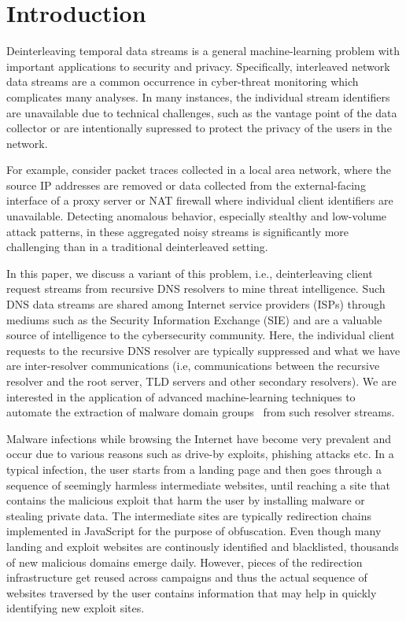 \documentclass[conference]{IEEEtran}
\begin{document}
	\section{Introduction}
	
	Deinterleaving temporal data streams is a general machine-learning
	problem with important applications to security and privacy.
	Specifically, interleaved network data streams are a common occurrence
	in cyber-threat monitoring which complicates many analyses.  In many
	instances, the individual stream identifiers are unavailable due
	to technical challenges, such as the vantage point of the data
	collector or are intentionally supressed to protect the privacy
	of the users in the network.
	
	For example, consider packet traces collected in a local area network,
	where the source IP addresses are removed or data collected from the
	external-facing interface of a proxy server or NAT firewall
	where individual client identifiers are unavailable.  Detecting anomalous
	behavior, especially stealthy and low-volume attack patterns, in
	these aggregated noisy streams is significantly more challenging than
	in a traditional deinterleaved setting.
	
	In this paper, we discuss a variant of this problem, i.e.,
	deinterleaving client request streams from recursive DNS resolvers
	to mine threat intelligence.  Such DNS data streams are shared
	among Internet service providers (ISPs) through mediums such
	as the Security Information Exchange (SIE) and are a valuable
	source of intelligence to the cybersecurity community.  Here, the individual
	client requests to the recursive DNS resolver are typically suppressed and
	what we have are inter-resolver communications (i.e, communications
	between the recursive resolver and the root server, TLD servers
	and other secondary resolvers).  We are interested in
	the application of advanced machine-learning techniques to automate
	the extraction of malware domain groups~\cite{} from such resolver streams.
	
	Malware infections while browsing the Internet have become very
	prevalent and occur due to various reasons such as drive-by exploits,
	phishing attacks etc.  In a typical infection, the user starts from
	a landing page and then goes through a sequence of seemingly harmless
	intermediate websites, until reaching a site that contains the malicious
	exploit that harm the user by installing malware or stealing private
	data.  The intermediate sites are typically redirection chains implemented
	in JavaScript for the purpose of obfuscation.
	Even though many landing and exploit websites are continously identified and
	blacklisted, thousands of new malicious domains emerge daily.  However,
	pieces of the redirection infrastructure get reused across campaigns
	and thus the actual sequence of websites traversed by the user contains
	information that may help in quickly identifying new exploit sites.
	
\end{document}

